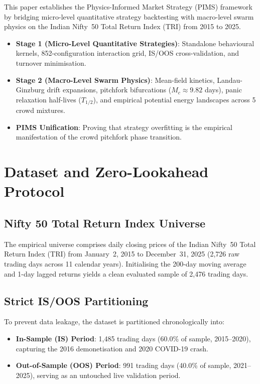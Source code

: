 \documentclass[10pt,twocolumn,twoside,a4paper]{article}
\begin{document}
This paper establishes the Physics-Informed Market Strategy (PIMS) framework by bridging micro-level
quantitative strategy backtesting with macro-level swarm physics on the Indian Nifty~50 Total Return
Index (TRI) from 2015 to 2025.

\begin{tcolorbox}[title=The Two-Stage Research Architecture]
\begin{itemize}
    \item \textbf{Stage 1 (Micro-Level Quantitative Strategies)}: Standalone behavioural kernels,
    852-configuration interaction grid, IS/OOS cross-validation, and turnover minimisation.
    \item \textbf{Stage 2 (Macro-Level Swarm Physics)}: Mean-field kinetics, Landau-Ginzburg drift
    expansions, pitchfork bifurcations ($M_c\approx9.82$ days), panic relaxation half-lives
    ($T_{1/2}$), and empirical potential energy landscapes across 5 crowd mixtures.
    \item \textbf{PIMS Unification}: Proving that strategy overfitting is the empirical manifestation
    of the crowd pitchfork phase transition.
\end{itemize}
\end{tcolorbox}

\section{Dataset and Zero-Lookahead Protocol}

\subsection{Nifty 50 Total Return Index Universe}
The empirical universe comprises daily closing prices of the Indian Nifty~50 Total Return Index (TRI)
from January~2, 2015 to December~31, 2025 (2{,}726 raw trading days across 11 calendar years).
Initialising the 200-day moving average and 1-day lagged returns yields a clean evaluated sample of
2{,}476 trading days.

\subsection{Strict IS/OOS Partitioning}
To prevent data leakage, the dataset is partitioned chronologically into:
\begin{itemize}
    \item \textbf{In-Sample (IS) Period}: 1{,}485 trading days (60.0\% of sample, 2015--2020),
    capturing the 2016 demonetisation and 2020 COVID-19 crash.
    \item \textbf{Out-of-Sample (OOS) Period}: 991 trading days (40.0\% of sample, 2021--2025),
    serving as an untouched live validation period.
\end{itemize}
\end{document}
